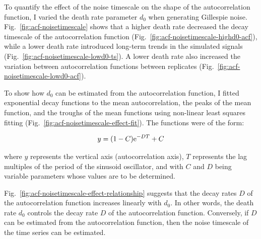 To quantify the effect of the noise timescale on the shape of the autocorrelation function, I varied the death rate parameter $d_{0}$ when generating Gillespie noise.
%
Fig.\ \ref{fig:acf-noisetimescale} shows that a higher death rate decreased the decay timescale of the autocorrelation function (Fig.\ \ref{fig:acf-noisetimescale-highd0-acf}), while a lower death rate introduced long-term trends in the simulated signals (Fig.\ \ref{fig:acf-noisetimescale-lowd0-ts}).
A lower death rate also increased the variation between autocorrelation functions between replicates (Fig.\ \ref{fig:acf-noisetimescale-lowd0-acf}).

To show how $d_{0}$ can be estimated from the autocorrelation function, I fitted exponential decay functions to the mean autocorrelation, the peaks of the mean function, and the troughs of the mean functions using non-linear least squares fitting (Fig.\ \ref{fig:acf-noisetimescale-effect-fit}).
The functions were of the form:

\begin{equation}
  y = (1-C)\mathrm{e}^{-DT}+C
  \label{eq:acf-expofit}
\end{equation}

where $y$ represents the vertical axis (autocorrelation axis), $T$ represents the lag multiples of the period of the sinusoid oscillator, and with $C$ and $D$ being variable parameters whose values are to be determined.

Fig.\ \ref{fig:acf-noisetimescale-effect-relationship} suggests that the decay rates $D$ of the autocorrelation function increases linearly with $d_{0}$.
In other words, the death rate $d_{0}$ controls the decay rate $D$ of the autocorrelation function.
Conversely, if $D$ can be estimated from the autocorrelation function, then the noise timescale of the time series can be estimated.


